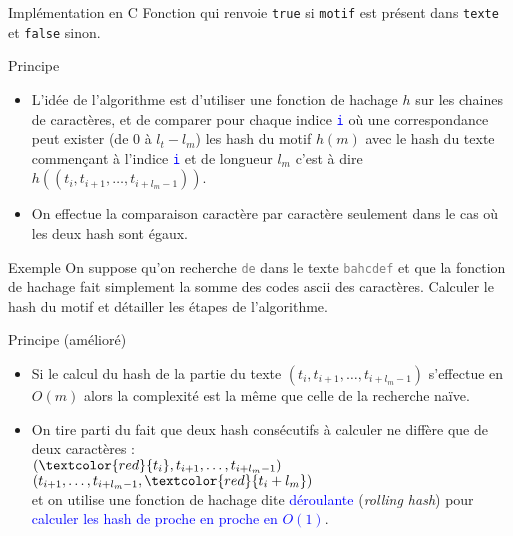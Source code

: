 \documentclass[10pt]{beamer}
\begin{document}
\begin{frame}{\Ctitle}{\stitle}
	\begin{block}{Implémentation en C}
		Fonction qui renvoie {\tt true} si {\tt motif} est présent dans {\tt texte} et {\tt false} sinon.
	\end{block}
\end{frame}

\begin{frame}{\Ctitle}{\stitle}
	\begin{block}{Principe}
		\begin{itemize}
			\item<1-> L'idée de l'algorithme est d'utiliser une fonction de hachage $h$ sur les chaines de caractères, et de comparer pour chaque indice \textcolor{blue}{\tt i} où une correspondance peut exister (de 0 à $l_t-l_m$) les hash du motif $h(m)$ avec le hash du texte commençant à l'indice \textcolor{blue}{\tt i} et de longueur $l_m$ c'est à dire $h((t_i,t_{i+1},\dots,t_{i+l_m-1}))$.
			\item<2-> On effectue la comparaison caractère par caractère seulement dans le cas où les deux hash sont égaux.
		\end{itemize}
	\end{block}
	{\begin{exampleblock}{Exemple}
			On suppose qu'on recherche \og{}\textcolor{gray}{\tt de}\fg{} dans le texte \og{}\textcolor{gray}{\tt bahcdef}\fg{} et que la fonction de hachage fait simplement la somme des codes {\sc ascii} des caractères. Calculer le hash du motif et détailler les étapes de l'algorithme.
		\end{exampleblock}}
\end{frame}

\begin{frame}{\Ctitle}{\stitle}
	\begin{block}{Principe (amélioré)}
		\begin{itemize}
			\item<3-> Si le calcul du hash de la partie du texte $(t_i,t_{i+1},\dots,t_{i+l_m-1})$ s'effectue en $O(m)$ alors la complexité est la même que celle de la recherche naïve.
			\item<4-> On tire parti du fait que deux hash consécutifs à calculer ne diffère que de deux caractères : \\
				$(\textcolor{red}{t_i},t_{i+1},\dots,t_{i+l_m-1})$ \\
				$(t_{i+1},\dots,t_{i+l_m-1},\textcolor{red}{t_i+l_m})$ \\
				et on utilise une fonction de hachage dite \textcolor{blue}{déroulante} (\textit{rolling hash}) pour \textcolor{blue}{calculer les hash de proche en proche en $O(1)$}.
		\end{itemize}
	\end{block}
\end{frame}
\end{document}
